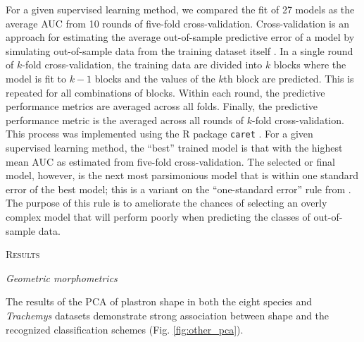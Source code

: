 \documentclass[12pt,letterpaper]{article}
\renewcommand{\section}[1]{%
\bigskip
\begin{center}
\begin{Large}
\normalfont\scshape #1
\medskip
\end{Large}
\end{center}}
\renewcommand{\subsection}[1]{%
\bigskip
\begin{center}
\begin{large}
\normalfont\itshape #1
\end{large}
\end{center}}
\begin{document}
For a given supervised learning method, we compared the fit of 27 models as the average AUC from 10 rounds of five-fold cross-validation. Cross-validation is an approach for estimating the average out-of-sample predictive error of a model by simulating out-of-sample data from the training dataset itself \citep{Hastie2009}. In a single round of \(k\)-fold cross-validation, the training data are divided into \(k\) blocks where the model is fit to \(k - 1\) blocks and the values of the \(k\)th block are predicted. This is repeated for all combinations of blocks. Within each round, the predictive performance metrics are averaged across all folds. Finally, the predictive performance metric is the averaged across all rounds of \(k\)-fold cross-validation. This process was implemented using the R package \texttt{caret} \citep{KuhnMAN2013}. For a given supervised learning method, the ``best'' trained model is that with the highest mean AUC as estimated from five-fold cross-validation. The selected or final model, however, is the next most parsimonious model that is within one standard error of the best model; this is a variant on the ``one-standard error'' rule from \citet{Hastie2009}. The purpose of this rule is to ameliorate the chances of selecting an overly complex model that will perform poorly when predicting the classes of out-of-sample data.




\section{Results}

\subsection{Geometric morphometrics}

The results of the PCA of plastron shape in both the eight species and \textit{Trachemys} datasets demonstrate strong association between shape and the recognized classification schemes (Fig. \ref{fig:other_pca}).
\end{document}
